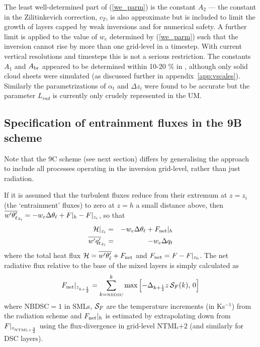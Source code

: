 \documentclass{UMDP_article}
\begin{document}
The least well-determined part of (\ref{we_parm}) is the constant
$A_2$ --- the constant in the Zilitinkevich correction, $c_T$, is also
approximate but is included to limit the growth of layers capped by
weak inversions and for numerical safety.  A further limit is applied
to the value of $w_e$ determined by (\ref{we_parm}) such that the
inversion cannot rise by more than one grid-level in a timestep.  With
current vertical resolutions and timesteps this is not a serious
restriction.  The constants $A_1$ and $A_{\rm br}$ appeared to be
determined within 10-20 \% in \cite{lock98}, although only solid cloud
sheets were simulated (as discussed further in
appendix~\ref{app:vscales}).  Similarly the parametrizations of
$\alpha_t$ and $\Delta z_i$ were found to be accurate but the
parameter $L_{rad}$ is currently only crudely represented in the UM.

\subsection{Specification of entrainment fluxes in the 9B scheme}
\label{sec:ent_flux}
Note that the 9C scheme (see next section) differs by generalising the
approach to include all processes operating in the inversion
grid-level, rather than just radiation.

If it is assumed that the turbulent fluxes reduce from their extremum
at $z=z_i$ (the `entrainment' fluxes) to zero at $z=h$ a small
distance above, then $ \overline{w'\theta_{\ell}'}_{z_i} = - w_e \Delta \theta_{\ell} + F|_h -
F|_{z_i}$, so that
\begin{eqnarray}
  {\cal H}|_{z_i} & =& - w_e \Delta \theta_{\ell} + F_{\rm net}|_h \nonumber\\
  \overline{w'q_t'}_{z_i}         & =& - w_e \Delta q_t
\end{eqnarray}
\label{discinv}
where the total heat flux ${\cal H} = \overline{w'\theta_{\ell}'} + F_{\rm net}$ and $F_{\rm net}
= F - F|_{z_{\rm b}}$.  The net radiative flux relative to the
base of the mixed layers is simply calculated as
\begin{equation*}
  F_{\rm net}|_{z_{k+\frac{1}{2}}} = \sum_{k=\mbox{\tiny \rm NBDSC}}^{k} \mbox{max}\left[ 
    - \Delta_{k+\frac{1}{2}} z \, {\cal S}_F(k), \,0 \right]
\end{equation*}
where NBDSC$=1$ in SMLs, ${\cal S}_F$ are the temperature
increments (in Ks$^{-1}$) from the radiation scheme and $F_{\rm net}|_h$
is estimated by extrapolating down from $F|_{z_{\mbox{\tiny \rm NTML}+\frac{3}{2}}
}$ using the flux-divergence in grid-level NTML$+2$ (and similarly for
DSC layers).
\end{document}
